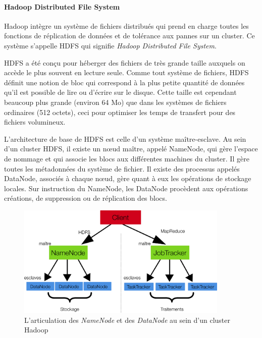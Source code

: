 \documentclass[12pt]{article}
\begin{document}
\paragraph{Hadoop Distributed File System}
Hadoop intègre un système de fichiers distribués qui prend en charge toutes les fonctions de réplication de données et de tolérance aux pannes sur un cluster. Ce système s'appelle HDFS qui signifie \textit{Hadoop Distributed File System}.
\par
HDFS a été conçu pour héberger des fichiers de très grande taille auxquels on accède le plus souvent en lecture seule. Comme tout système de fichiers, HDFS définit une notion de bloc qui correspond à la plus petite quantité de données qu'il est possible de lire ou d'écrire sur le disque. Cette taille est cependant beaucoup plus grande (environ 64 Mo) que dans les systèmes de fichiers ordinaires (512 octets), ceci pour optimiser les temps de transfert pour des fichiers volumineux.\par
L'architecture de base de HDFS est celle d'un système maître-esclave. Au sein d'un cluster HDFS, il existe un nœud maître, appelé NameNode, qui gère l'espace de nommage et qui associe les blocs aux différentes machines du cluster. Il gère toutes les métadonnées du système de fichier. Il existe des processus appelés DataNode, associés à chaque nœud, gère quant à eux les opérations de stockage locales. Sur instruction du NameNode, les DataNode procèdent aux opérations créations, de suppression ou de réplication des blocs.
\begin{figure}[H]
\centering
\includegraphics[width=0.9\textwidth]{hdfs}
\caption{L'articulation des \textit{NameNode} et des \textit{DataNode} au sein d'un cluster Hadoop}
\end{figure}
\end{document}
